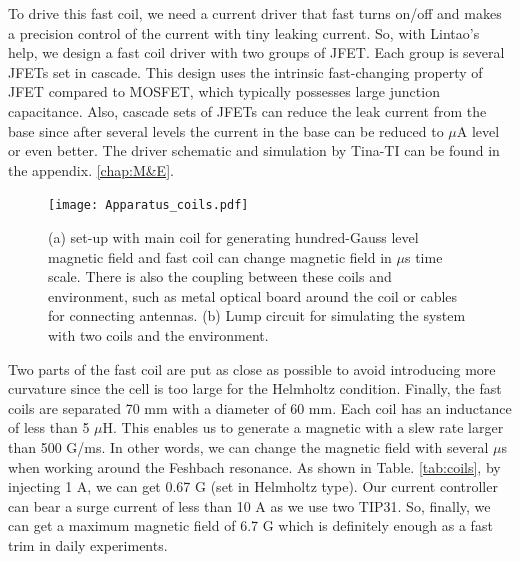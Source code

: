 To drive this fast coil, we need a current driver that fast turns on/off and makes a precision control of the current with tiny leaking current. So, with Lintao's help, we design a fast coil driver with two groups of JFET. Each group is several JFETs set in cascade. This design uses the intrinsic fast-changing property of JFET compared to MOSFET, which typically possesses large junction capacitance. Also, cascade sets of JFETs can reduce the leak current from the base since after several levels the current in the base can be reduced to $\mu$A level or even better. The driver schematic and simulation by Tina-TI can be found in the appendix. \ref{chap:M&E}.

\begin{figure}[htbp]
\begin{center}
\texttt{[image: Apparatus\_coils.pdf]}
\end{center}
\caption[Fast coil, main coil and environment]{(a) set-up with main coil for generating hundred-Gauss level magnetic field and fast coil can change magnetic field in $\mu$s time scale. There is also the coupling between these coils and environment, such as metal optical board around the coil or cables for connecting antennas. (b) Lump circuit for simulating the system with two coils and the environment.}
\label{Apparatus_coils}
\end{figure}

Two parts of the fast coil are put as close as possible to avoid introducing more curvature since the cell is too large for the Helmholtz condition. Finally, the fast coils are separated 70 mm with a diameter of 60 mm. Each coil has an inductance of less than 5 $\mu$H. This enables us to generate a magnetic with a slew rate larger than 500 G/ms. In other words, we can change the magnetic field with several $\mu$s when working around the Feshbach resonance. As shown in Table. \ref{tab:coils}, by injecting 1 A, we can get 0.67 G (set in Helmholtz type). Our current controller can bear a surge current of less than 10 A as we use two TIP31. So, finally, we can get a maximum magnetic field of 6.7 G which is definitely enough as a fast trim in daily experiments.


